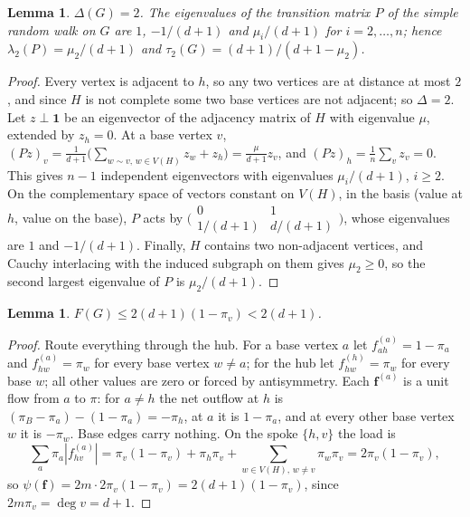 \documentclass[11pt]{amsart}
\newtheorem{lemma}[theorem]{Lemma}
\theoremstyle{definition}
\newcommand{\bfF}{\mathbf{f}}
\begin{document}
\begin{lemma}\label{lem:spectrum}
$\Delta(G)=2$. The eigenvalues of the transition matrix $P$ of the simple random walk on $G$ are $1$, $-1/(d+1)$ and $\mu_i/(d+1)$ for $i=2,\dots,n$; hence $\lambda_2(P)=\mu_2/(d+1)$ and $\tau_2(G)=(d+1)/(d+1-\mu_2)$.
\end{lemma}

\begin{proof}
Every vertex is adjacent to $h$, so any two vertices are at distance at most $2$, and since $H$ is not complete some two base vertices are not adjacent; so $\Delta=2$. Let $z\perp\mathbf1$ be an eigenvector of the adjacency matrix of $H$ with eigenvalue $\mu$, extended by $z_h=0$. At a base vertex $v$, $(Pz)_v=\frac1{d+1}\bigl(\sum_{w\sim v,\,w\in V(H)}z_w+z_h\bigr)=\frac{\mu}{d+1}z_v$, and $(Pz)_h=\frac1n\sum_vz_v=0$. This gives $n-1$ independent eigenvectors with eigenvalues $\mu_i/(d+1)$, $i\ge2$. On the complementary space of vectors constant on $V(H)$, in the basis (value at $h$, value on the base), $P$ acts by $\bigl(\begin{smallmatrix}0&1\\ 1/(d+1)&d/(d+1)\end{smallmatrix}\bigr)$, whose eigenvalues are $1$ and $-1/(d+1)$. Finally, $H$ contains two non-adjacent vertices, and Cauchy interlacing with the induced subgraph on them gives $\mu_2\ge0$, so the second largest eigenvalue of $P$ is $\mu_2/(d+1)$.
\end{proof}

\begin{lemma}\label{lem:hub}
$F(G)\le2(d+1)(1-\pi_v)<2(d+1)$.
\end{lemma}

\begin{proof}
Route everything through the hub. For a base vertex $a$ let $f^{(a)}_{ah}=1-\pi_a$ and $f^{(a)}_{hw}=\pi_w$ for every base vertex $w\ne a$; for the hub let $f^{(h)}_{hw}=\pi_w$ for every base $w$; all other values are zero or forced by antisymmetry. Each $\bfF^{(a)}$ is a unit flow from $a$ to $\pi$: for $a\ne h$ the net outflow at $h$ is $(\pi_B-\pi_a)-(1-\pi_a)=-\pi_h$, at $a$ it is $1-\pi_a$, and at every other base vertex $w$ it is $-\pi_w$. Base edges carry nothing. On the spoke $\{h,v\}$ the load is
\[
\sum_a\pi_a|f^{(a)}_{hv}|=\pi_v(1-\pi_v)+\pi_h\pi_v+\sum_{w\in V(H),\,w\ne v}\pi_w\pi_v=2\pi_v(1-\pi_v),
\]
so $\psi(\bfF)=2m\cdot2\pi_v(1-\pi_v)=2(d+1)(1-\pi_v)$, since $2m\pi_v=\deg v=d+1$.
\end{proof}
\end{document}
